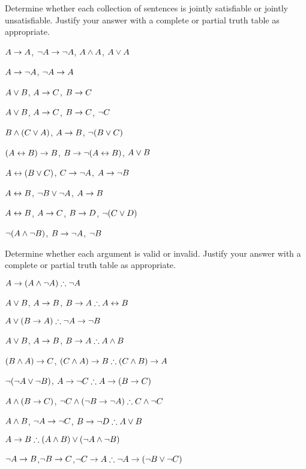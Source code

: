 \noindent\problempart
\label{pr.TT.satisfiable5}
Determine whether each collection of sentences is jointly satisfiable or jointly unsatisfiable. Justify your answer with a complete or partial truth table as appropriate.
\begin{compactlist}
\item $A\rightarrow A$, $\neg A \rightarrow \neg A$, $A\wedge A$, $A\vee A$ %
\item $A \rightarrow \neg A$, $\neg A \rightarrow A$%
\item $A\vee B$, $A\rightarrow C$, $B\rightarrow C$ %
\item $A \vee B$, $A \rightarrow C$, $B \rightarrow C$, $\neg C$ %
\item $B\wedge(C\vee A)$, $A\rightarrow B$, $\neg(B\vee C)$  %
\item $(A \leftrightarrow B) \rightarrow B$,  $B \rightarrow \neg (A \leftrightarrow B)$, $A \vee B$  %
\item $A\leftrightarrow(B\vee C)$, $C\rightarrow \neg A$, $A\rightarrow \neg B$ %
\item  $A \leftrightarrow B$,  $\neg B \vee \neg A$,  $A \rightarrow  B$ %
\item $A \leftrightarrow B$, $A \rightarrow C$, $B \rightarrow D$, $\neg(C \vee D)$ %
\item $\neg (A \wedge \neg B)$,  $B \rightarrow \neg A$, $\neg B$   %
\end{compactlist}

\noindent\problempart Determine whether each argument is valid or invalid. Justify your answer with a complete or partial truth table as appropriate.
\label{pr.TT.valid5} 
\begin{compactlist}
\item $A\eif(A\eand\enot A)\therefore \enot A$%
\item $A \vee B$, $A \rightarrow B$, $B \eif A \therefore  A \eiff B$  %
\item $A\eor(B\eif A)\therefore \enot A \eif \enot B$ %
\item $A \vee B$, $A \rightarrow B$, $ B \eif A \therefore  A \eand B$ %
\item $(B\wedge A)\rightarrow C$, $(C\eand A)\eif B\therefore (C\eand B)\eif A$ %
\item $\neg (\neg A \vee \neg B)$, $A \eif \enot C \therefore  A \eif (B \eif C)$ %
\item $A \wedge (B \rightarrow C)$, $\enot C \eand (\enot B \eif \enot A)\therefore C \eand \enot C$ %
\item $A \wedge B$, $\neg A \rightarrow \neg C$, $B \eif \enot D \therefore  A \eor B$ %
\item $A \eif B\therefore (A \eand B) \eor (\enot A \eand \enot B)$ %
\item $\neg A \rightarrow B$,$ \neg B \rightarrow C $,$ \enot C \eif A \therefore  \enot A \eif (\enot B \eor \enot C) $%

\end{compactlist}

